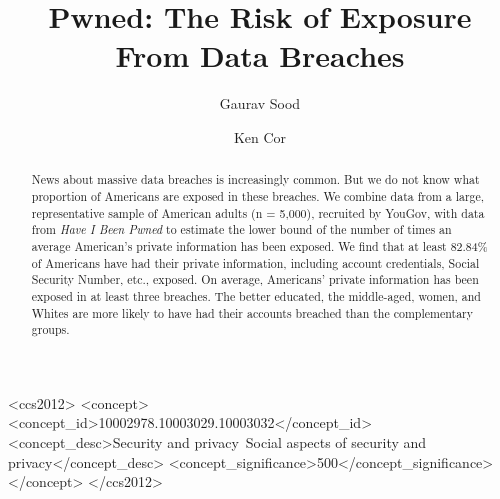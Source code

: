 \documentclass[sigconf]{acmart}
\begin{document}

%
\title[Pwned]{Pwned: The Risk of Exposure From Data Breaches}

%
\author{Gaurav Sood}
\authornotemark[1]
\affiliation{%
  \institution{}
}

\author{Ken Cor}
\authornotemark[2]
\affiliation{%
  \institution{The University of Alberta}
  \city{Edmonton}
  \country{Canada}
}
%
\renewcommand{\shortauthors}{Sood and Cor}

%
\begin{abstract}
News about massive data breaches is increasingly common. But we do not know what proportion of Americans are exposed in these breaches. We combine data from a large, representative sample of American adults (n = 5,000), recruited by YouGov, with data from \textit{Have I Been Pwned} to estimate the lower bound of the number of times an average American's private information has been exposed. We find that at least 82.84\% of Americans have had their private information, including account credentials, Social Security Number, etc., exposed. On average, Americans' private information has been exposed in at least three breaches. The better educated, the middle-aged, women, and Whites are more likely to have had their accounts breached than the complementary groups.
\end{abstract}

%
%
\begin{CCSXML}
<ccs2012>
<concept>
<concept_id>10002978.10003029.10003032</concept_id>
<concept_desc>Security and privacy~Social aspects of security and privacy</concept_desc>
<concept_significance>500</concept_significance>
</concept>
</ccs2012>
\end{CCSXML}
\end{document}
